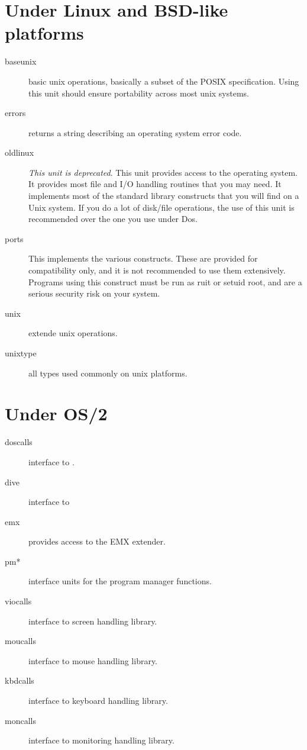 \section{Under Linux and BSD-like platforms}
\begin{description}
\item[baseunix] basic unix operations, basically a subset of the POSIX specification. 
Using this unit should ensure portability across most unix systems.
\item[errors] returns a string describing an operating system error code.
\item[oldlinux]  \emph{This unit is deprecated}. This unit provides access to the
\linux operating system. It provides most file and I/O handling routines
that you may need. It implements most of the standard  library constructs
that you will find on a Unix system. If you do a lot of disk/file
operations, the use of this unit is recommended over the one you use under
Dos.
\item[ports] This implements the various  constructs. These are
provided for compatibility only, and it is not recommended to use them
extensively. Programs using this construct must be run as ruit or setuid
root, and are a serious security risk on your system.
\item[unix] extende unix operations.
\item[unixtype] all types used commonly on unix platforms.
\end{description}

\section{Under OS/2}
\begin{description}
\item[doscalls] interface to .
\item[dive] interface to 
\item[emx] provides access to the EMX extender.
\item[pm*] interface units for the program manager functions.
\item[viocalls] interface to  screen handling library.
\item[moucalls] interface to  mouse handling library.
\item[kbdcalls] interface to  keyboard handling library.
\item[moncalls] interface to  monitoring handling library.
\end{description}

